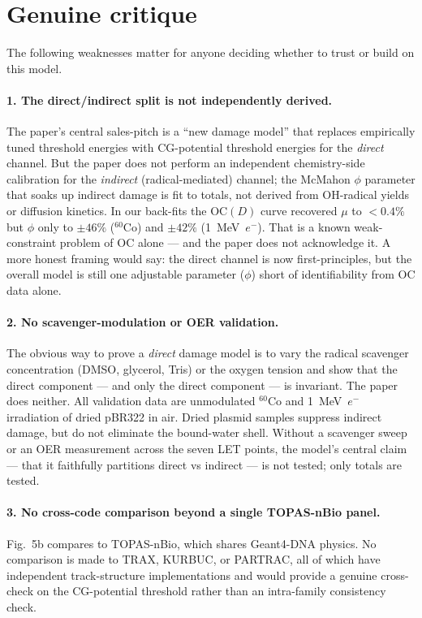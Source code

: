 \documentclass[11pt]{article}
\begin{document}
\section{Genuine critique}\label{sec:critique}
The following weaknesses matter for anyone deciding whether to trust or
build on this model.

\paragraph{1. The direct/indirect split is not independently derived.}
The paper's central sales-pitch is a ``new damage model'' that replaces
empirically tuned threshold energies with CG-potential threshold
energies for the \emph{direct} channel. But the paper does not perform
an independent chemistry-side calibration for the \emph{indirect}
(radical-mediated) channel; the McMahon $\phi$ parameter that soaks up
indirect damage is fit to totals, not derived from OH-radical yields or
diffusion kinetics. In our back-fits the OC$(D)$ curve recovered $\mu$
to $<0.4\%$ but $\phi$ only to $\pm 46\%$ ($^{60}$Co) and $\pm 42\%$
(\SI{1}{MeV}~$e^-$). That is a known weak-constraint problem
of OC alone --- and the paper does not acknowledge it. A more honest
framing would say: the direct channel is now first-principles, but the
overall model is still one adjustable parameter ($\phi$) short of
identifiability from OC data alone.

\paragraph{2. No scavenger-modulation or OER validation.}
The obvious way to prove a \emph{direct} damage model is to vary the
radical scavenger concentration (DMSO, glycerol, Tris) or the oxygen
tension and show that the direct component --- and only the direct
component --- is invariant. The paper does neither. All validation data
are unmodulated $^{60}$Co and \SI{1}{MeV}~$e^-$ irradiation of dried
pBR322 in air. Dried plasmid samples suppress indirect damage, but do
not eliminate the bound-water shell. Without a scavenger sweep or an
OER measurement across the seven LET points, the model's central
claim --- that it faithfully partitions direct vs indirect --- is not
tested; only totals are tested.

\paragraph{3. No cross-code comparison beyond a single TOPAS-nBio panel.}
Fig.~5b compares to TOPAS-nBio, which shares Geant4-DNA physics.
No comparison is made to TRAX, KURBUC, or PARTRAC, all of which have
independent track-structure implementations and would provide a genuine
cross-check on the CG-potential threshold rather than an intra-family
consistency check.
\end{document}
